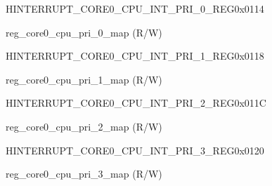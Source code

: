 \begin{register}{H}{INTERRUPT\_CORE0\_CPU\_INT\_PRI\_0\_REG}{0x0114}\label{regdesc:INTERRUPTCORE0CPUINTPRI0REG}
%
%
\regnewline%
\begin{regdesc}\begin{reglist}
\label{fielddesc:INTERRUPTCORE0CPUPRI0MAP}\item [INTERRUPT\_CORE0\_CPU\_PRI\_0\_MAP] reg\_core0\_cpu\_pri\_0\_map (R/W)
\end{reglist}\end{regdesc}
\end{register}


\begin{register}{H}{INTERRUPT\_CORE0\_CPU\_INT\_PRI\_1\_REG}{0x0118}\label{regdesc:INTERRUPTCORE0CPUINTPRI1REG}
%
%
\regnewline%
\begin{regdesc}\begin{reglist}
\label{fielddesc:INTERRUPTCORE0CPUPRI1MAP}\item [INTERRUPT\_CORE0\_CPU\_PRI\_1\_MAP] reg\_core0\_cpu\_pri\_1\_map (R/W)
\end{reglist}\end{regdesc}
\end{register}


\begin{register}{H}{INTERRUPT\_CORE0\_CPU\_INT\_PRI\_2\_REG}{0x011C}\label{regdesc:INTERRUPTCORE0CPUINTPRI2REG}
%
%
\regnewline%
\begin{regdesc}\begin{reglist}
\label{fielddesc:INTERRUPTCORE0CPUPRI2MAP}\item [INTERRUPT\_CORE0\_CPU\_PRI\_2\_MAP] reg\_core0\_cpu\_pri\_2\_map (R/W)
\end{reglist}\end{regdesc}
\end{register}


\begin{register}{H}{INTERRUPT\_CORE0\_CPU\_INT\_PRI\_3\_REG}{0x0120}\label{regdesc:INTERRUPTCORE0CPUINTPRI3REG}
%
%
\regnewline%
\begin{regdesc}\begin{reglist}
\label{fielddesc:INTERRUPTCORE0CPUPRI3MAP}\item [INTERRUPT\_CORE0\_CPU\_PRI\_3\_MAP] reg\_core0\_cpu\_pri\_3\_map (R/W)
\end{reglist}\end{regdesc}
\end{register}


